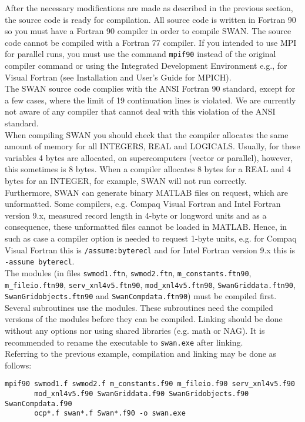 \documentclass[12pt]{book}
\begin{document}
After the necessary modifications are made as described in the previous section, the source code is
ready for compilation. All source code is written in Fortran 90 so you must have a
Fortran 90 compiler in order to compile SWAN. The source code cannot be compiled with a Fortran 77
compiler. If you intended to use MPI for parallel runs, you must use the command {\tt mpif90} instead
of the original compiler command or using the Integrated Development Environment e.g., for Visual
Fortran (see Installation and User's Guide for MPICH).
\\[2ex]
\noindent
The SWAN source code complies with the ANSI Fortran 90 standard, except for a few cases, where
the limit of 19 continuation lines is violated. We are currently not aware of any compiler that cannot
deal with this violation of the ANSI standard.
\\[2ex]
\noindent
When compiling SWAN you should check that the compiler allocates the same amount of memory
for all {\scriptsize INTEGERS}, {\scriptsize REAL} and {\scriptsize LOGICALS}. Usually, for these
variables 4 bytes are allocated, on supercomputers (vector or parallel), however, this sometimes
is 8 bytes. When a compiler allocates 8 bytes for a {\scriptsize REAL} and 4 bytes for an
{\scriptsize INTEGER}, for example, SWAN will not run correctly.
\\[2ex]
\noindent
Furthermore, SWAN can generate binary MATLAB files on request, which are unformatted. Some compilers,
e.g. Compaq Visual Fortran and Intel Fortran version 9.x, measured record length in 4-byte or longword units and
as a consequence, these unformatted files cannot be loaded in MATLAB. Hence, in such as case a
compiler option is needed to request 1-byte units, e.g. for Compaq Visual Fortran this is
{\tt /assume:byterecl} and for Intel Fortran version 9.x this is {\tt -assume byterecl}.
\\[2ex]
\noindent
The modules (in files {\tt swmod1.ftn}, {\tt swmod2.ftn}, {\tt m\_constants.ftn90},
{\tt m\_fileio.ftn90}, {\tt serv\_xnl4v5.ftn90}, {\tt mod\_xnl4v5.ftn90},
{\tt SwanGriddata.ftn90}, {\tt SwanGridobjects.ftn90} and {\tt SwanCompdata.ftn90}) must be compiled first.
Several subroutines use the modules. These subroutines need the compiled versions of the modules before they can be compiled.
Linking should be done without any options nor using shared libraries (e.g. math or NAG). It is
recommended to rename the executable to {\tt swan.exe} after linking.
\\[2ex]
\noindent
Referring to the previous example, compilation and linking may be done as follows:
\begin{verbatim}
mpif90 swmod1.f swmod2.f m_constants.f90 m_fileio.f90 serv_xnl4v5.f90
       mod_xnl4v5.f90 SwanGriddata.f90 SwanGridobjects.f90 SwanCompdata.f90
       ocp*.f swan*.f Swan*.f90 -o swan.exe
\end{verbatim}
\end{document}
